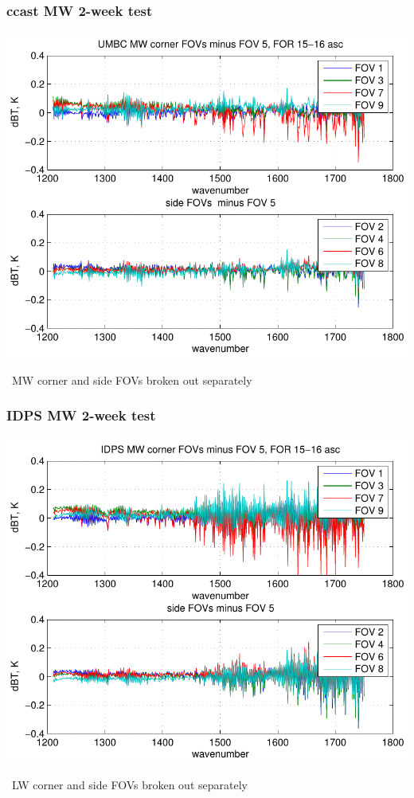 \documentclass[11pt]{beamer}
\begin{document}
\begin{frame}
\frametitle{ccast MW 2-week test}

\begin{center}
  \includegraphics[scale=0.6]{umbc_MW_dif_5-18_Mar.pdf}
\end{center}

\ccast\ MW corner and side FOVs broken out separately

\end{frame}
\begin{frame}
\frametitle{IDPS MW 2-week test}

\begin{center}
  \includegraphics[scale=0.6]{idps_MW_dif_5-18_Mar.pdf}
\end{center}

\idps\ LW corner and side FOVs broken out separately

\end{frame}
\end{document}
